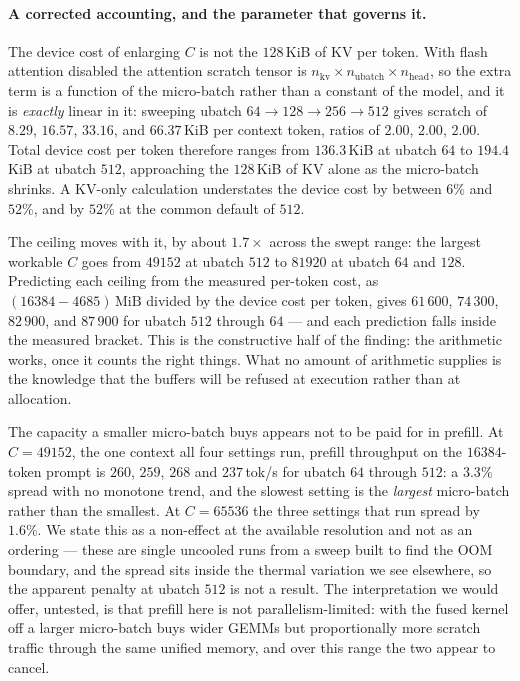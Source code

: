 \documentclass[manuscript,anonymous,review]{acmart}
\begin{document}
\paragraph{A corrected accounting, and the parameter that governs it.}
The device cost of enlarging $C$ is not the $128$\,KiB of KV per token.
With flash attention disabled the attention scratch tensor is
$n_\text{kv} \times n_\text{ubatch} \times n_\text{head}$, so the extra
term is a function of the micro-batch rather than a constant of the
model, and it is \emph{exactly} linear in it: sweeping ubatch
$64 \rightarrow 128 \rightarrow 256 \rightarrow 512$ gives scratch of
$8.29$, $16.57$, $33.16$, and $66.37$\,KiB per context token, ratios of
$2.00$, $2.00$, $2.00$. Total device cost per token therefore ranges
from $136.3$\,KiB at ubatch $64$ to $194.4$\,KiB at ubatch $512$,
approaching the $128$\,KiB of KV alone as the micro-batch shrinks. A
KV-only calculation understates the device cost by between $6\%$ and
$52\%$, and by $52\%$ at the common default of $512$.

The ceiling moves with it, by about $1.7\times$ across the swept range:
the largest workable $C$ goes from $49152$ at ubatch $512$ to $81920$
at ubatch $64$ and $128$. Predicting each ceiling from the measured
per-token cost, as $(16384 - 4685)\,\text{MiB}$ divided by the device
cost per token, gives $61\,600$, $74\,300$, $82\,900$, and $87\,900$
for ubatch $512$ through $64$ --- and each prediction falls inside the
measured bracket. This is the constructive half of the finding: the
arithmetic works, once it counts the right things. What no amount of
arithmetic supplies is the knowledge that the buffers will be refused
at execution rather than at allocation.

The capacity a smaller micro-batch buys appears not to be paid for in
prefill. At $C = 49152$, the one context all four settings run, prefill
throughput on the $16384$-token prompt is $260$, $259$, $268$ and
$237$\,tok/s for ubatch $64$ through $512$: a $3.3\%$ spread with no
monotone trend, and the slowest setting is the \emph{largest}
micro-batch rather than the smallest. At $C = 65536$ the three settings
that run spread by $1.6\%$. We state this as a non-effect at the
available resolution and not as an ordering --- these are single
uncooled runs from a sweep built to find the OOM boundary, and the
spread sits inside the thermal variation we see elsewhere, so the
apparent penalty at ubatch $512$ is not a result. The interpretation we
would offer, untested, is that prefill here is not
parallelism-limited: with the fused kernel off a larger micro-batch
buys wider GEMMs but proportionally more scratch traffic through the
same unified memory, and over this range the two appear to cancel.
\end{document}
